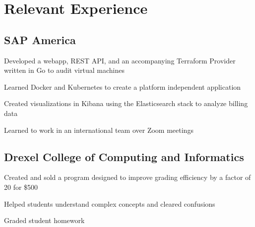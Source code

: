 \documentclass[]{deedy-resume-openfont}
\begin{document}
\begin{minipage}[t]{0.66\textwidth}


    \section{Relevant Experience}

    \subsection{SAP America}
    \vspace{\topsep} %
    \begin{tightemize}
        \item Developed a webapp, REST API, and an accompanying Terraform Provider written in Go to audit virtual machines
        \item Learned Docker and Kubernetes to create a platform independent application
        \item Created visualizations in Kibana using the Elasticsearch stack to analyze billing data
        \item Learned to work in an international team over Zoom meetings
    \end{tightemize}
    \sectionsep
    
    \subsection{Drexel College of Computing and Informatics}
    \vspace{\topsep} %
    \begin{tightemize}
        \item Created and sold a program designed to improve grading efficiency by a factor of 20 for \$500
        \item Helped students understand complex concepts and cleared confusions
        \item Graded student homework
    \end{tightemize}
    \sectionsep


\end{minipage}
\end{document}
